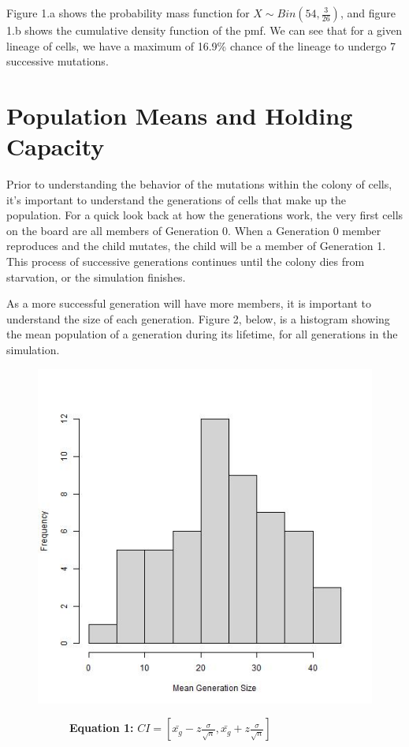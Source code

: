 \documentclass[12pt]{article}
\begin{document}
	Figure 1.a shows the probability mass function for $X \sim Bin(54, \frac{3}{26})$, and figure 1.b shows the cumulative density function of the pmf. 
	We can see that for a given lineage of cells, we have a maximum of 16.9\% chance of the lineage to undergo 7 successive mutations.

  
\section{Population Means and Holding Capacity}

   Prior to understanding the behavior of the mutations within the colony of cells, it's important to understand the generations of cells that make up the population.
   For a quick look back at how the generations work, the very first cells on the board are all members of Generation 0.
   When a Generation 0 member reproduces and the child mutates, the child will be a member of Generation 1.
   This process of successive generations continues until the colony dies from starvation, or the simulation finishes.

   As a more successful generation will have more members, it is important to understand the size of each generation. 
   Figure 2, below, is a histogram showing the mean population of a generation during its lifetime, for all generations in the simulation.

	\begin{figure}[H]
		\caption{}
		\label{fig:}
		\centering
		\includegraphics[width=.5\textwidth]{genHist.jpeg}
	\end{figure}
	\pagebreak
	\begin{figure}[H]
		\begin{subfigure}[b]{\textwidth}
			\center
			\textbf{Equation 1: } $CI = [\bar{x_g} - z \frac{\sigma}{\sqrt{n}}, \bar{x_g} + z \frac{\sigma}{\sqrt{n}}]$ 
		\end{subfigure}
	\end{figure}
\end{document}
